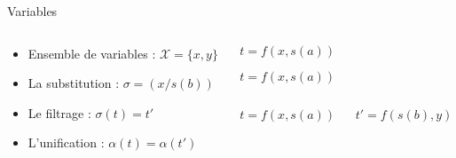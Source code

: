 \begin{frame}{Variables}
  \begin{columns}
    \begin{column}{0.6\textwidth}
      \begin{itemize}
      \item<1-> Ensemble de variables : $\mathcal X = \{x, y\}$
      \item<2-> La substitution : $\sigma = (x / s(b))$
      \item<4-> Le filtrage : $\sigma(t) = t'$
      \item<6-> L'unification : $\alpha(t) = \alpha(t')$
      \end{itemize}
    \end{column}
    \begin{column}{0.4\textwidth}
      \begin{overprint}
        \begin{center}
          $t = f(x,s(a))$\\
        \end{center}
        \begin{center}
          $t = f(x,s(a))$\\
        \end{center}
        \begin{center}
          \begin{columns}
            \begin{column}{0.5\textwidth}
              $t = f(x,s(a))$\\
            \end{column}
            \begin{column}{0.5\textwidth}
              $t' = f(s(b),y)$\\
            \end{column}
          \end{columns}
        \end{center}
      \end{overprint}
      

\end{column}
\end{columns}
\end{frame}

